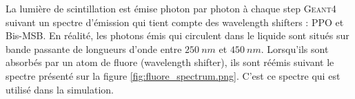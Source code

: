 La lumière de scintillation est émise photon par photon à chaque step \textsc{Geant4} suivant un spectre d'émission qui tient compte des wavelength shifters : PPO et Bis-MSB. En réalité, les photons émis qui circulent dans le liquide sont situés sur bande passante de longueurs d'onde entre $\SI{250}{nm}$ et $\SI{450}{nm}$. Lorsqu'ils sont absorbés par un atom de fluore (wavelength shifter), ils sont réémis suivant le spectre présenté sur la figure \ref{fig:fluore_spectrum.png}. C'est ce spectre qui est utilisé dans la simulation.\\

